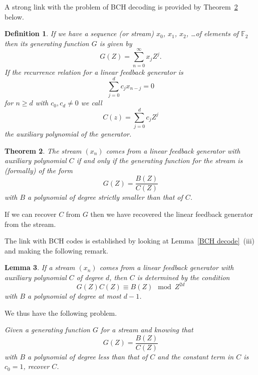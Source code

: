 \documentclass[12pt,a4paper]{article}
\theoremstyle{plain}
\newtheorem{theorem}{Theorem}[section]
\newtheorem{lemma}[theorem]{Lemma}
\newtheorem{definition}[theorem]{Definition}
\theoremstyle{definition}
\begin{document}
A strong link with the problem of BCH decoding
is provided by Theorem~\ref{quotient} below.
\begin{definition}
If we have a sequence (or stream) $x_{0}$, $x_{1}$,
$x_{2}$, \dots of elements of ${\mathbb F}_{2}$ then
its \emph{generating function} $G$ is given by
\[G(Z)=\sum_{n=0}^{\infty}x_{j}Z^{j}.\]
If the recurrence relation for
a linear feedback generator is
\[\sum_{j=0}^{d}c_{j}x_{n-j}=0\]
for $n\geq d$ with $c_{0},c_{d}\neq 0$
we call
\[C(z)=\sum_{j=0}^{d}c_{j}Z^{j}\]
the auxiliary polynomial of the generator.
\end{definition}
\begin{theorem}\label{quotient} The stream $(x_{n})$
comes from a linear feedback generator with
auxiliary polynomial $C$ if and only if
the generating function for the stream is (formally)
of the form
\[G(Z)=\frac{B(Z)}{C(Z)}\]
with $B$ a polynomial of degree strictly smaller than that
of $C$.
\end{theorem}
\noindent
If we can recover $C$ from $G$ then we have recovered
the linear feedback generator from the stream.

The link with BCH codes is established
by looking at Lemma~\ref{BCH decode}~(iii) and
making the following remark.
\begin{lemma}\label{how long}
If a stream $(x_{n})$
comes from a linear feedback generator with
auxiliary polynomial $C$ of degree $d$,
then $C$ is determined by the condition
\[G(Z)C(Z)\equiv B(Z)\mod{Z^{2d}}\]
with $B$ a polynomial of degree at most $d-1$.
\end{lemma}

We thus have the following problem.

\emph{Given a generating function $G$
for a stream  and knowing that
\[G(Z)=\frac{B(Z)}{C(Z)}\]
with $B$ a polynomial of degree less than that
of $C$ and the constant term in $C$ is
$c_{0}=1$, recover $C$.}

\vspace{1\baselineskip}
\end{document}
